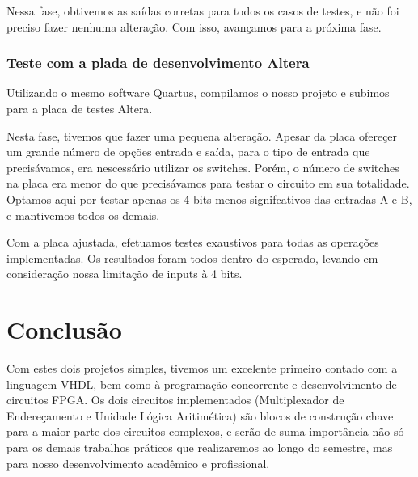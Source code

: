 \documentclass{article}
\begin{document}
Nessa fase, obtivemos as saídas corretas para todos os casos de testes, e não foi preciso fazer nenhuma alteração. Com isso, avançamos para a próxima fase.

\subsubsection{Teste com a plada de desenvolvimento Altera}
Utilizando o mesmo software Quartus, compilamos o nosso projeto e subimos para a placa de testes Altera.

Nesta fase, tivemos que fazer uma pequena alteração. Apesar da placa ofereçer um grande número de opções entrada e saída, para o tipo de entrada que precisávamos, era nescessário utilizar os switches. Porém, o número de switches na placa era menor do que precisávamos para testar o circuito em sua totalidade. Optamos aqui por testar apenas os 4 bits menos signifcativos das entradas A e B, e mantivemos todos os demais.

Com a placa ajustada, efetuamos testes exaustivos para todas as operações implementadas. Os resultados foram todos dentro do esperado, levando em consideração nossa limitação de inputs à 4 bits.

\section{Conclusão}
Com estes dois projetos simples, tivemos um excelente primeiro contado com a linguagem VHDL, bem como à programação concorrente e desenvolvimento de circuitos FPGA. Os dois circuitos implementados (Multiplexador de Endereçamento e Unidade Lógica Aritimética) são blocos de construção chave para a maior parte dos circuitos complexos, e serão de suma importância não só para os demais trabalhos práticos que realizaremos ao longo do semestre, mas para nosso desenvolvimento acadêmico e profissional.
\end{document}
